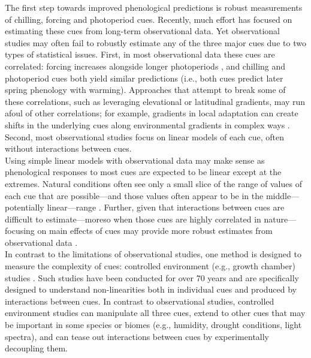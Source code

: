 \documentclass[11pt,letter]{article}
\begin{document}
The first step towards improved phenological predictions is robust measurements of chilling, forcing and photoperiod cues. Recently, much effort has focused on estimating these cues from long-term observational data. Yet observational studies may often fail to robustly estimate any of the three major cues due to two types of statistical issues. First, in most observational data these cues are correlated: forcing increases alongside longer photoperiods \citep{sarahailene2020}, and chilling and photoperiod cues both yield similar predictions (i.e., both cues predict later spring phenology with warming). Approaches that attempt to break some of these correlations, such as leveraging elevational or latitudinal gradients, may run afoul of other correlations; for example, gradients in local adaptation can create shifts in the underlying cues along environmental gradients in complex ways \citep{tansey2017}. Second, most observational studies focus on linear models of each cue, often without interactions between cues. \\

Using simple linear models with observational data may make sense as phenological responses to most cues are expected to be linear except at the extremes. Natural conditions often see only a small slice of the range of values of each cue that are possible---and those values often appear to be in the middle---potentially linear---range \citep{gauzere2017,ettinger2020}. Further, given that interactions between cues are difficult to estimate---moreso when those cues are highly correlated in nature---focusing on main effects of cues may provide more robust estimates from observational data  \citep[main effects integrate over any interactions and require lower statistical power to robustly estimate compared to interactions,][]{gelman2006}. \\

In contrast to the limitations of observational studies, one method is designed to measure the complexity of cues: controlled environment (e.g., growth chamber) studies \citep{nagano2012,satake2013}. Such studies have been conducted for over 70 years and are specifically designed to understand non-linearities both in individual cues and produced by interactions between cues. In contrast to observational studies, controlled environment studies can manipulate all three cues, extend to other cues that may be important in some species or biomes (e.g., humidity, drought conditions, light spectra), and can tease out interactions between cues by experimentally decoupling them.\\
\end{document}
